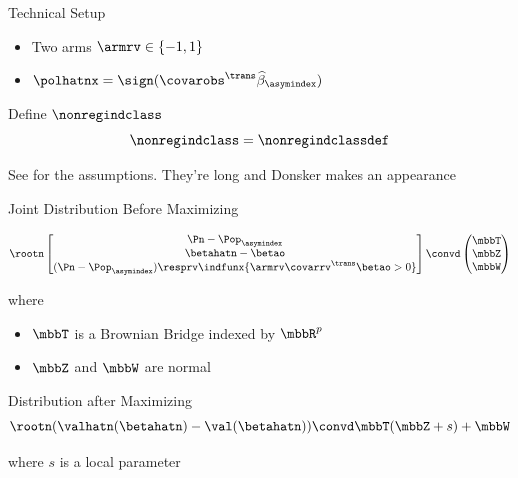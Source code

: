 \documentclass[aspectratio=169, professionalfonts]{beamer}
\begin{document}
\begin{frame}{Technical Setup}
	\begin{itemize}
		\item	Two arms $\armrv \in \{-1, 1\}$
		      \vfill

		\item $\polhatnx = \sign(\covarobs^{\trans}\widehat{\beta}_{\asymindex})$
	\end{itemize}
	\vfill

	Define $\nonregindclass$
	\begin{displaymath}
		\nonregindclass = \nonregindclassdef
	\end{displaymath}
	\vfill

	See  for the assumptions. They're long and
	Donsker makes an appearance
\end{frame}

\begin{frame}{Joint Distribution Before Maximizing}

	\begin{displaymath}
		\rootn \begin{bmatrix}\Pn - \Pop_{\asymindex} \\
			\betahatn - \betao      \\
			(\Pn - \Pop_{\asymindex})\resprv \indfunx{\armrv \covarrv^{\trans}\betao
				> 0}\end{bmatrix} \convd \begin{pmatrix} \mbbT \\ \mbbZ \\
			\mbbW\end{pmatrix}
	\end{displaymath}

	where

	\begin{itemize}
		\item $\mbbT$ is a Brownian Bridge indexed by $\mbbR^p$
		\item $\mbbZ$ and $\mbbW$ are normal
	\end{itemize}
\end{frame}

\begin{frame}{Distribution after Maximizing}
	\begin{displaymath}
		\rootn (\valhatn (\betahatn) - \val(\betahatn)) \convd \mbbT(\mbbZ + s)
		+ \mbbW
	\end{displaymath}

	where $s$ is a local parameter

\end{frame}
\end{document}
